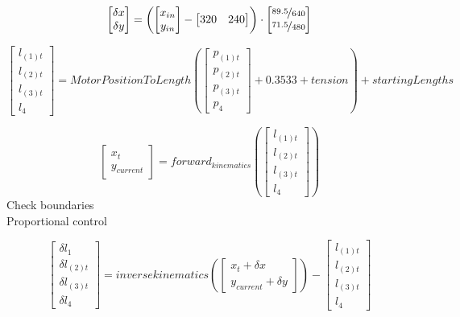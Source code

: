\documentclass{article}
\begin{document}
  \[
\begin{bmatrix}
	\delta{x}\\
\delta{y}
\end{bmatrix}
=
\left(
\begin{bmatrix}
x_{in}\\
y_{in}
\end{bmatrix}
-
\begin{bmatrix}
320 & 240
\end{bmatrix}
\right)
\cdot
\begin{bmatrix}
\nicefrac{89.5}{640}\\
\nicefrac{71.5}{480}
\end{bmatrix}
\]


\[
\begin{bmatrix}
l_{(1)t}\\
l_{(2)t}\\
l_{(3)t}\\
l_4
\end{bmatrix}
=MotorPositionToLength\left(
\begin{bmatrix}
p_{(1)t}\\
p_{(2)t}\\
p_{(3)t}\\
p_4
\end{bmatrix}
+ 0.3533 + tension
\right)
+ startingLengths
\]

\[
\begin{bmatrix}
x_{t}\\
y_{current}
\end{bmatrix}
= forward_{kinematics} \left(
\begin{bmatrix}
l_{(1)t}\\
l_{(2)t}\\
l_{(3)t}\\
l_4
\end{bmatrix}
\right)
\]
Check boundaries\\
Proportional control

\[
\begin{bmatrix}
\delta{l_1}\\
\delta{l_{(2)t}}\\
\delta{l_{(3)t}}\\
\delta{l_4}
\end{bmatrix}
= inverse{kinematics}\left(
\begin{bmatrix}
x_{t} + \delta{x}\\
y_{current} + \delta{y}
\end{bmatrix}
\right)
-
\begin{bmatrix}
l_{(1)t}\\
l_{(2)t}\\
l_{(3)t}\\
l_4
\end{bmatrix}
\]
\end{document}

